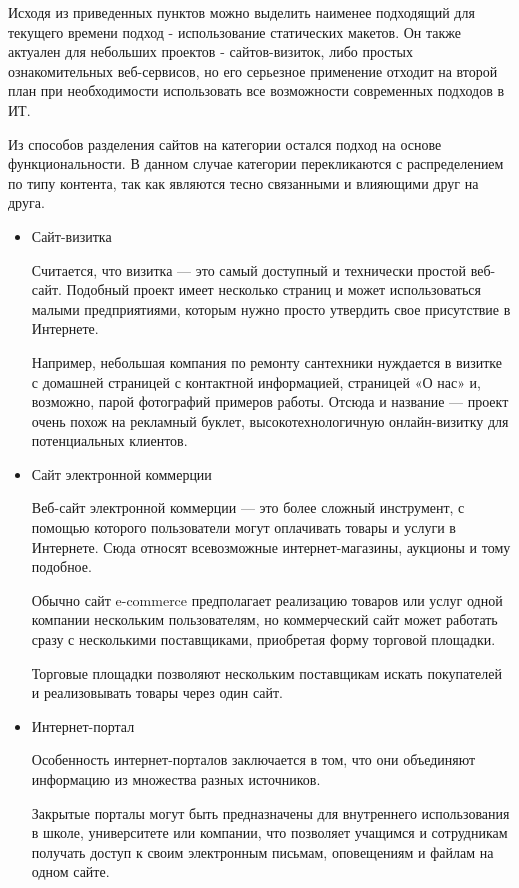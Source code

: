 Исходя из приведенных пунктов можно выделить наименее подходящий для текущего времени подход - использование статических макетов.
Он также актуален для небольших проектов - сайтов-визиток, либо простых ознакомительных веб-сервисов, но его серьезное применение отходит на второй план при необходимости использовать все возможности современных подходов в ИТ.

Из способов разделения сайтов на категории остался подход на основе функциональности.
В данном случае категории перекликаются с распределением по типу контента, так как являются тесно связанными и влияющими друг на друга.


\begin{itemize}
    \item Сайт-визитка

    Считается, что визитка — это самый доступный и технически простой веб-сайт.
    Подобный проект имеет несколько страниц и может использоваться малыми предприятиями, которым нужно просто утвердить свое присутствие в Интернете.
    
    Например, небольшая компания по ремонту сантехники нуждается в визитке с домашней страницей с контактной информацией, страницей «О нас» и, возможно, парой фотографий примеров работы.
    Отсюда и название — проект очень похож на рекламный буклет, высокотехнологичную онлайн-визитку для потенциальных клиентов.
    
    \item Сайт электронной коммерции
    
    Веб-сайт электронной коммерции — это более сложный инструмент, с помощью которого пользователи могут оплачивать товары и услуги в Интернете.
    Сюда относят всевозможные интернет-магазины, аукционы и тому подобное.
    
    Обычно сайт e-commerce предполагает реализацию товаров или услуг одной компании нескольким пользователям, но коммерческий сайт может работать сразу с несколькими поставщиками, приобретая форму торговой площадки.
    
    Торговые площадки позволяют нескольким поставщикам искать покупателей и реализовывать товары через один сайт.
    
    \item Интернет-портал
    
    Особенность интернет-порталов заключается в том, что они объединяют информацию из множества разных источников.
    
    Закрытые порталы могут быть предназначены для внутреннего использования в школе, университете или компании, что позволяет учащимся и сотрудникам получать доступ к своим электронным письмам, оповещениям и файлам на одном сайте.
    

\end{itemize}
